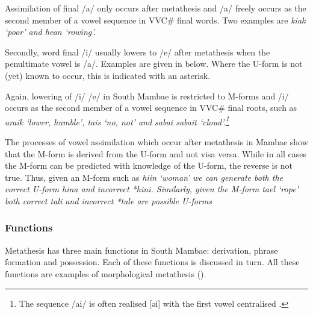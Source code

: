 Assimilation of final /a/ only occurs after
metathesis and /a/ freely occurs as the second
member of a vowel sequence in VVC{\#} final words.
Two examples are \it{kiak} `poor' and \it{hean} `rowing'.

Secondly, word final /i/ usually lowers to /e/ after metathesis
when the penultimate vowel is /a/.
Examples are given in  below.
Where the U-form is not (yet) known to occur,
this is indicated with an asterisk.

\begin{exe}
	\label{ex:aCi->aeC-Mam}
\end{exe}

Again, lowering of /i/ {\ra} /e/ in South Mambae
is restricted to M-forms and /i/ occurs
as the second member of a vowel sequence in VVC{\#}
final roots, such as \it{araik} `lower, humble',
\it{tais} `no, not' and \it{sabai} {\tl} \it{sabait} `cloud'.\footnote{
		The sequence /ai/ is often realised [əi]
		with the first vowel centralised \citep[6]{gr14}.}

The processes of vowel assimilation which
occur after metathesis in Mambae show
that the M-form is derived from the U-form and not visa versa.
While in all cases the M-form can be predicted
with knowledge of the U-form, the reverse is not true.
Thus, given an M-form such as \it{hiin} `woman'
we can generate both the correct U-form \it{hina}
and incorrect \it{*hini}. Similarly, given the
M-form \it{tael} `rope' both correct \it{tali}
and incorrect \it{*tale} are possible U-forms

\subsubsection{Functions}\label{sec:MamFun}
Metathesis has three main functions in South Mambae:
derivation, phrase formation and possession.
Each of these functions is discussed in turn.
All these functions are examples of morphological metathesis ().

